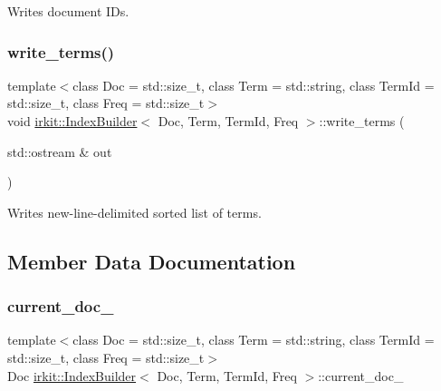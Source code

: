Writes document I\+Ds. 

\mbox{\label{classirkit_1_1IndexBuilder_a7c81e735e585ec41a7e5e334e4416874}} 
\subsubsection{\texorpdfstring{write\+\_\+terms()}{write\_terms()}}
{\footnotesize\ttfamily template$<$class Doc  = std\+::size\+\_\+t, class Term  = std\+::string, class Term\+Id  = std\+::size\+\_\+t, class Freq  = std\+::size\+\_\+t$>$ \\
void \mbox{\hyperlink{classirkit_1_1IndexBuilder}{irkit\+::\+Index\+Builder}}$<$ Doc, Term, Term\+Id, Freq $>$\+::write\+\_\+terms (\begin{DoxyParamCaption}\item[{std\+::ostream \&}]{out }\end{DoxyParamCaption})\hspace{0.3cm}{\ttfamily [inline]}}



Writes new-\/line-\/delimited sorted list of terms. 



\subsection{Member Data Documentation}
\mbox{\label{classirkit_1_1IndexBuilder_a52d46fb2bd04b9e5ee0e9fdcf98e2f7b}} 
\subsubsection{\texorpdfstring{current\+\_\+doc\+\_\+}{current\_doc\_}}
{\footnotesize\ttfamily template$<$class Doc  = std\+::size\+\_\+t, class Term  = std\+::string, class Term\+Id  = std\+::size\+\_\+t, class Freq  = std\+::size\+\_\+t$>$ \\
Doc \mbox{\hyperlink{classirkit_1_1IndexBuilder}{irkit\+::\+Index\+Builder}}$<$ Doc, Term, Term\+Id, Freq $>$\+::current\+\_\+doc\+\_\+\hspace{0.3cm}{\ttfamily [protected]}}

